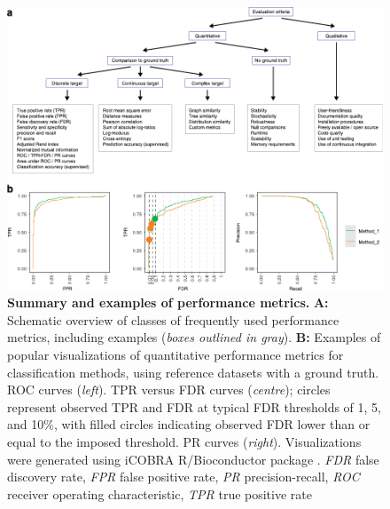 \begin{figure}[htb!]
	\centering
	\includegraphics[width=\textwidth]{fig/essential_guidelines_figure2} 
	\caption{\textbf{Summary and examples of performance metrics.} \textbf{A:} Schematic overview of classes of frequently used performance metrics, including examples (\textit{boxes outlined in gray}). \textbf{B:} Examples of popular visualizations of quantitative performance metrics for classification methods, using reference datasets with a ground truth. ROC curves (\textit{left}). TPR versus FDR curves (\textit{centre}); circles represent observed TPR and FDR at typical FDR thresholds of 1, 5, and 10\%, with filled circles indicating observed FDR lower than or equal to the imposed threshold. PR curves (\textit{right}). Visualizations were generated using iCOBRA R/Bioconductor package \cite{soneson_icobraopenreproducible_2016}. \textit{FDR} false discovery rate, \textit{FPR} false positive rate, \textit{PR} precision-recall, \textit{ROC} receiver operating characteristic, \textit{TPR} true positive rate}
	\label{fig:fig2_metrics}
\end{figure}


